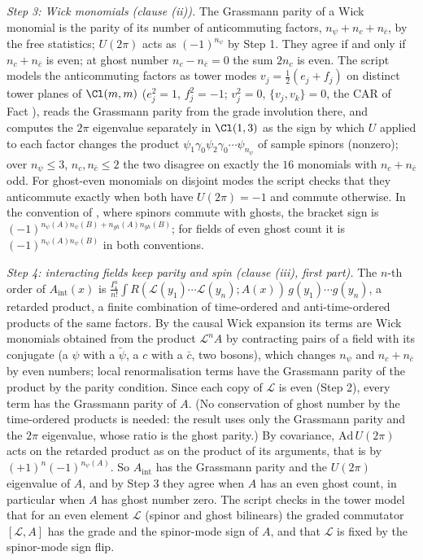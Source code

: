 \emph{Step 3: Wick monomials (clause (ii)).} The Grassmann parity of a Wick monomial is the parity of its number of anticommuting factors, $n_{\psi} + n_{c} + n_{\bar c}$, by the free statistics; $U(2\pi)$ acts as $(-1)^{n_{\psi}}$ by Step 1. They agree if and only if $n_{c} + n_{\bar c}$ is even; at ghost number $n_{c} - n_{\bar c} = 0$ the sum $2n_{c}$ is even. The script models the anticommuting factors as tower modes $v_{j} = \tfrac12(e_{j} + f_{j})$ on distinct tower planes of $\Cl(m, m)$ ($e_{j}^{2} = 1$, $f_{j}^{2} = -1$; $v_{j}^{2} = 0$, $\{v_{j}, v_{k}\} = 0$, the CAR of Fact ), reads the Grassmann parity from the grade involution there, and computes the $2\pi$ eigenvalue separately in $\Cl(1,3)$ as the sign by which $U$ applied to each factor changes the product $\psi_{1}\gamma_{0}\psi_{2}\gamma_{0}\cdots\psi_{n_{\psi}}$ of sample spinors (nonzero); over $n_{\psi} \le 3$, $n_{c}, n_{\bar c} \le 2$ the two disagree on exactly the $16$ monomials with $n_{c} + n_{\bar c}$ odd. For ghost-even monomials on disjoint modes the script checks that they anticommute exactly when both have $U(2\pi) = -1$ and commute otherwise. In the convention of \cite{DutschFredenhagen1999}, where spinors commute with ghosts, the bracket sign is $(-1)^{n_{\psi}(A)n_{\psi}(B) + n_{gh}(A)n_{gh}(B)}$; for fields of even ghost count it is $(-1)^{n_{\psi}(A)n_{\psi}(B)}$ in both conventions.

\emph{Step 4: interacting fields keep parity and spin (clause (iii), first part).} The $n$-th order of $A_{\mathrm{int}}(x)$ is $\tfrac{I_{4}^{n}}{n!}\int R(\mathcal{L}(y_{1})\cdots\mathcal{L}(y_{n}); A(x))\,g(y_{1})\cdots g(y_{n})$, a retarded product, a finite combination of time-ordered and anti-time-ordered products of the same factors. By the causal Wick expansion its terms are Wick monomials obtained from the product $\mathcal{L}^{n}A$ by contracting pairs of a field with its conjugate (a $\psi$ with a $\tilde\psi$, a $c$ with a $\bar c$, two bosons), which changes $n_{\psi}$ and $n_{c} + n_{\bar c}$ by even numbers; local renormalisation terms have the Grassmann parity of the product by the parity condition. Since each copy of $\mathcal{L}$ is even (Step 2), every term has the Grassmann parity of $A$. (No conservation of ghost number by the time-ordered products is needed: the result uses only the Grassmann parity and the $2\pi$ eigenvalue, whose ratio is the ghost parity.) By covariance, $\mathrm{Ad}\,U(2\pi)$ acts on the retarded product as on the product of its arguments, that is by $(+1)^{n}(-1)^{n_{\psi}(A)}$. So $A_{\mathrm{int}}$ has the Grassmann parity and the $U(2\pi)$ eigenvalue of $A$, and by Step 3 they agree when $A$ has an even ghost count, in particular when $A$ has ghost number zero. The script checks in the tower model that for an even element $\mathcal{L}$ (spinor and ghost bilinears) the graded commutator $[\mathcal{L}, A]$ has the grade and the spinor-mode sign of $A$, and that $\mathcal{L}$ is fixed by the spinor-mode sign flip.

